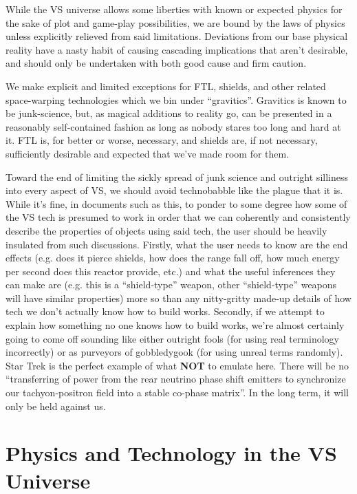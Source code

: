 \begin{itemize}
While the VS universe allows some liberties with known or
expected physics for the sake of plot and game-play possibilities, we
are bound by the laws of physics unless explicitly relieved from said
limitations. Deviations from our base physical reality have a nasty
habit of causing cascading implications that aren't desirable, and
should only be undertaken with both good cause and firm caution. 

We make explicit and limited exceptions for FTL, shields, and other
related space-warping technologies which we bin under
``gravitics''. Gravitics is known to be junk-science, but, as magical
additions to reality go, can be presented in a reasonably
self-contained fashion as long as nobody stares too long and hard at
it. FTL is, for better or worse, necessary, and shields are, if not
necessary, sufficiently desirable and expected that we've made room
for them.

Toward the end of limiting the sickly spread of junk science and
outright silliness into every aspect of VS, we should avoid
technobabble like the plague that it is. While it's fine, in documents
such as this, to ponder to some degree how some of the VS tech is
presumed to work in order that we can coherently and consistently
describe the properties of objects using said tech, the user should be
heavily insulated from such discussions. Firstly, what the user needs
to know are the end effects (e.g. does it pierce shields, how does the
range fall off, how much energy per second does this reactor provide,
etc.) and what the useful inferences they can make are (e.g. this is
a ``shield-type'' weapon, other ``shield-type'' weapons will have
similar properties) more so than any nitty-gritty made-up details of
how tech we don't actually know how to build works. Secondly, if we
attempt to explain how something no one knows how to build works,
we're almost certainly going to come off sounding like either outright
fools (for using real terminology incorrectly) or as purveyors of
gobbledygook (for using unreal terms randomly). Star Trek is the
perfect example of what {\bf NOT} to emulate here. There will be no
``transferring of power from the rear neutrino phase shift emitters
to synchronize our tachyon-positron field into a stable
co-phase matrix''. In the long term, it will only be held against us.

\end{itemize}

\section{Physics and Technology in the VS Universe}
\label{sec:VSphysics}
